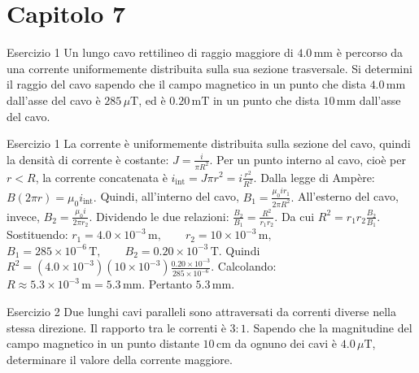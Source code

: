 \documentclass[a4paper]{article}
\begin{document}
\section{Capitolo 7}
\begin{snippetexercise}{Esercizio 1}
    Un lungo cavo rettilineo di raggio maggiore di \(4.0\,\mathrm{mm}\) è
    percorso da una corrente uniformemente distribuita sulla sua sezione
    trasversale. Si determini il raggio del cavo sapendo che il campo magnetico
    in un punto che dista \(4.0\,\mathrm{mm}\) dall'asse del cavo è
    \(285\,\mu\mathrm{T}\), ed è \(0.20\,\mathrm{mT}\) in un punto che dista
    \(10\,\mathrm{mm}\) dall'asse del cavo.

\end{snippetexercise}
\begin{snippetsolution}{Esercizio 1}
    La corrente è uniformemente distribuita sulla sezione del cavo, quindi la
    densità di corrente è costante:
    \(J = \frac{i}{\pi R^2}.\)
    Per un punto interno al cavo, cioè per \(r<R\), la corrente concatenata è
    \(i_{\mathrm{int}} = J\pi r^2 = i\frac{r^2}{R^2}.\)
    Dalla legge di Ampère:
    \(B(2\pi r)=\mu_0 i_{\mathrm{int}}.\)
    Quindi, all'interno del cavo,
    \(B_1 = \frac{\mu_0 i r_1}{2\pi R^2}.\)
    All'esterno del cavo, invece,
    \(B_2 = \frac{\mu_0 i}{2\pi r_2}.\)
    Dividendo le due relazioni:
    \(\frac{B_2}{B_1} = \frac{R^2}{r_1r_2}.\)
    Da cui
    \(R^2 = r_1r_2\frac{B_2}{B_1}.\)
    Sostituendo:
    \(r_1 = 4.0 \times 10^{-3}\,\mathrm{m}, \qquad r_2 = 10 \times 10^{-3}\,\mathrm{m},\)
    \(B_1 = 285 \times 10^{-6}\,\mathrm{T}, \qquad B_2 = 0.20 \times 10^{-3}\,\mathrm{T}.\)
    Quindi
    \(R^2 = \left(4.0 \times 10^{-3}\right) \left(10 \times 10^{-3}\right) \frac{0.20 \times 10^{-3}}{285 \times 10^{-6}}.\)
    Calcolando:
    \(R \approx 5.3 \times 10^{-3}\,\mathrm{m} = 5.3\,\mathrm{mm}.\)
    Pertanto
    \(\boxed{5.3\,\mathrm{mm}}.\)
\end{snippetsolution}
\begin{snippetexercise}{Esercizio 2}
    Due lunghi cavi paralleli sono attraversati da correnti diverse nella stessa
    direzione. Il rapporto tra le correnti è \(3:1\). Sapendo che la magnitudine
    del campo magnetico in un punto distante \(10\,\mathrm{cm}\) da ognuno dei
    cavi è \(4.0\,\mu\mathrm{T}\), determinare il valore della corrente maggiore.

\end{snippetexercise}
\end{document}
